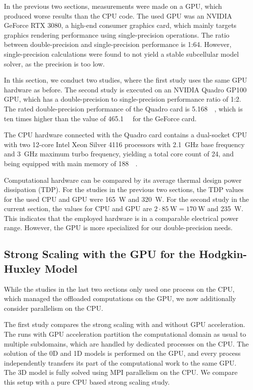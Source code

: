 In the previous two sections, measurements were made on a GPU, which produced worse results than the CPU code. The used GPU was an NVIDIA GeForce RTX 3080, a high-end consumer graphics card, which mainly targets graphics rendering performance using single-precision operations. The ratio between double-precision and single-precision performance is 1:64. However, single-precision calculations were found to not yield a stable subcellular model solver, as the precision is too low. 

In this section, we conduct two studies, where the first study uses the same GPU hardware as before. The second study is executed on an NVIDIA Quadro GP100 GPU, which has a double-precision to single-precision performance ratio of 1:2.
The rated double-precision performance of the Quadro card is \SI{5.168}{\tera\flops}, which is ten times higher than the value of \SI{465.1}{\giga\flops} for the GeForce card. 

The CPU hardware connected with the Quadro card contains a dual-socket CPU with two 12-core Intel Xeon Silver 4116 processors with \SI{2.1}{\giga\hertz} base frequency and \SI{3}{\giga\hertz} maximum turbo frequency, yielding a total core count of 24, and being equipped with main memory of \SI{188}{\gibi\byte}. 

Computational hardware can be compared by its average thermal design power dissipation (TDP). For the studies in the previous two sections, the TDP values for the used CPU and GPU were \SI{165}{\watt} and \SI{320}{\watt}. For the second study in the current section, the values for CPU and GPU are $2\cdot \SI{85}{\watt} = \SI{170}{\watt}$ and \SI{235}{\watt}. This indicates that the employed hardware is in a comparable electrical power range. However, the GPU is more specialized for our double-precision needs.

\subsection{Strong Scaling with the GPU for the Hodgkin-Huxley Model}\label{sec:strong_scaling_gpu_hodgkin_huxley}

While the studies in the last two sections only used one process on the CPU, which managed the offloaded computations on the GPU,
we now additionally consider parallelism on the CPU.

The first study compares the strong scaling with and without GPU acceleration. The runs with GPU acceleration partition the computational domain as usual to multiple subdomains, which are handled by dedicated processes on the CPU. The solution of the 0D and 1D models is performed on the GPU, and every process independently transfers its part of the computational work to the same GPU. The 3D model is fully solved using MPI parallelism on the CPU. We compare this setup with a pure CPU based strong scaling study.

